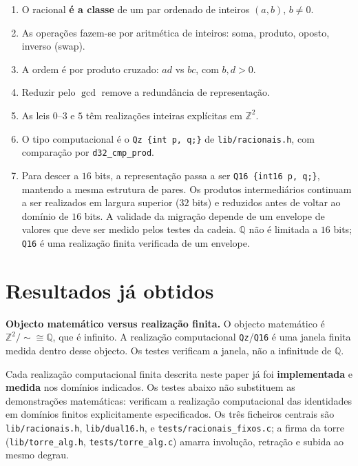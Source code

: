 \documentclass[11pt,a4paper]{article}
\newcommand{\code}[1]{\texttt{\small #1}}
\begin{document}
\begin{enumerate}
  \item O racional \textbf{é a classe} de um par ordenado de inteiros $(a,b)$,
        $b\neq 0$.
  \item As operações fazem-se por aritmética de inteiros: soma, produto, oposto,
        inverso (swap).
  \item A ordem é por produto cruzado: $ad$ vs $bc$, com $b,d>0$.
  \item Reduzir pelo $\gcd$ remove a redundância de representação.
  \item As leis $0$--$3$ e $5$ têm realizações inteiras explícitas em
        $\mathbb{Z}^{2}$.
  \item O tipo computacional é o \code{Qz \{int p, q;\}} de
        \code{lib/racionais.h}, com comparação por \code{d32\_cmp\_prod}.
  \item Para descer a $16$ bits, a representação passa a ser
        \code{Q16 \{int16 p, q;\}}, mantendo a mesma estrutura de pares. Os
        produtos intermediários continuam a ser realizados em largura superior
        ($32$ bits) e reduzidos antes de voltar ao domínio de $16$ bits. A
        validade da migração depende de um envelope de valores que deve ser
        medido pelos testes da cadeia. $\mathbb{Q}$ não é limitada a $16$
        bits; \code{Q16} é uma realização finita verificada de um envelope.
\end{enumerate}

\section{Resultados já obtidos}\label{sec:ja}

\noindent\textbf{Objecto matemático versus realização finita.} O objecto
matemático é $\mathbb{Z}^{2}/{\sim}\cong\mathbb{Q}$, que é infinito. A
realização computacional \code{Qz}/\code{Q16} é uma janela finita medida
dentro desse objecto. Os testes verificam a janela, não a infinitude de
$\mathbb{Q}$.

\medskip\noindent
Cada realização computacional finita descrita neste paper já foi
\textbf{implementada} e \textbf{medida} nos domínios indicados. Os testes abaixo não substituem as demonstrações matemáticas:
verificam a realização computacional das identidades em domínios finitos
explicitamente especificados.
Os três ficheiros centrais são \code{lib/racionais.h},
\code{lib/dual16.h}, e \code{tests/racionais\_fixos.c}; a firma da torre
(\code{lib/torre\_alg.h}, \code{tests/torre\_alg.c}) amarra involução,
retração e subida ao mesmo degrau.
\end{document}
